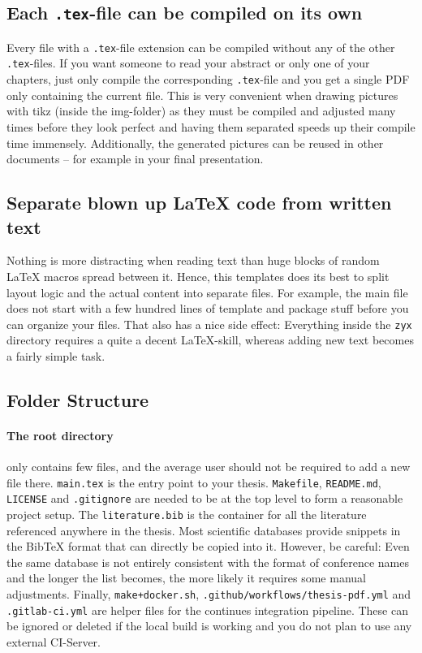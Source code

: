 \documentclass[../main.tex]{subfiles}
\begin{document}
\subsection{Each \texttt{.tex}-file can be compiled on its own}
Every file with a \texttt{.tex}-file extension can be compiled without any of the other \texttt{.tex}-files.
If you want someone to read your abstract or only one of your chapters, just only compile the corresponding \texttt{.tex}-file and you get a single PDF only containing the current file.
This is very convenient when drawing pictures with tikz (inside the img-folder) as they must be compiled and adjusted many times before they look perfect and having them separated speeds up their compile time immensely.
Additionally, the generated pictures can be reused in other documents -- for example in your final presentation.


\subsection{Separate blown up LaTeX code from written text}

Nothing is more distracting when reading text than huge blocks of random LaTeX macros spread between it.
Hence, this templates does its best to split layout logic and the actual content into separate files.
For example, the main file does not start with a few hundred lines of template and package stuff before you can organize your files.
That also has a nice side effect: Everything inside the \texttt{zyx} directory requires a quite a decent LaTeX-skill, whereas adding new text becomes a fairly simple task.

\newpage
\subsection{Folder Structure}

\paragraph{The root directory} only contains few files, and the average user should not be required to add a new file there.
\texttt{main.tex} is the entry point to your thesis.
\texttt{Makefile}, \texttt{README.md}, \texttt{LICENSE} and \texttt{.gitignore} are needed to be at the top level to form a reasonable project setup.
The \texttt{literature.bib} is the container for all the literature referenced anywhere in the thesis.
Most scientific databases provide snippets in the BibTeX format that can directly be copied into it.
However, be careful: Even the same database is not entirely consistent with the format of conference names and the longer the list becomes, the more likely it requires some manual adjustments.
Finally, \texttt{make+docker.sh}, \texttt{.github/workflows/thesis-pdf.yml} and \texttt{.gitlab-ci.yml} are helper files for the continues integration pipeline.
These can be ignored or deleted if the local build is working and you do not plan to use any external CI-Server.
\end{document}
